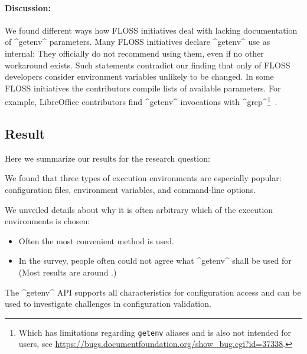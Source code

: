 \paragraph{Discussion:}
We found different ways how FLOSS initiatives deal with lacking documentation of ^getenv^ parameters.
Many FLOSS initiatives declare ^getenv^ use as internal:
They officially do not recommend using them, even if no other workaround exists.
Such statements contradict our finding that only  of FLOSS developers consider environment variables unlikely to be changed.
In some FLOSS initiatives the contributors compile lists of available parameters.
For example, LibreOffice contributors find ^getenv^ invocations with ^grep^\footnote{Which has limitations regarding \texttt{getenv} aliases and is also not intended for users, see \url{https://bugs.documentfoundation.org/show_bug.cgi?id=37338}.}~\cite{raab2017challenges}.



\subsection{Result}

Here we summarize our results for the research question:
\rqMotivationCurrentState*

\begin{finding}
We found that three types of execution environments are especially popular:
configuration files, environment variables, and command-line options.

We unveiled details about why it is often arbitrary which of the execution environments is chosen:
\begin{itemize}
\item Often the most convenient method is used.
\item In the survey, people often could not agree what ^getenv^ shall be used for (Most results are around .)
\end{itemize}
\end{finding}

The ^getenv^ API supports all characteristics for configuration access and can be used to investigate challenges in configuration validation.

